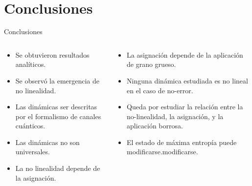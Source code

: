 \section{Conclusiones}

\begin{frame}{Conclusiones}
    \begin{columns}
        \begin{column}{0.5\textwidth}
            \begin{itemize}
                \item Se obtuvieron resultados analíticos.\pause
                \item Se observó la emergencia de no linealidad.\pause
                \item Las dinámicas ser descritas por el formalismo de canales cuánticos.\pause
                \item Las dinámicas no son universales.\pause
                \item La no linealidad depende de la asignación.\pause
            \end{itemize}
        \end{column}
        \begin{column}{0.5\textwidth}
            \begin{itemize}
                \item La asignación depende de la aplicación de grano grueso.\pause
                \item Ninguna dinámica estudiada es no lineal en el caso de no-error.\pause
                \item Queda por estudiar la relación entre la no-linealidad, la asignación, y la aplicación borrosa.\pause
                \item El estado de máxima entropía puede modificarse.modificarse.\pause
            \end{itemize}
        \end{column}
    \end{columns}
\end{frame}
